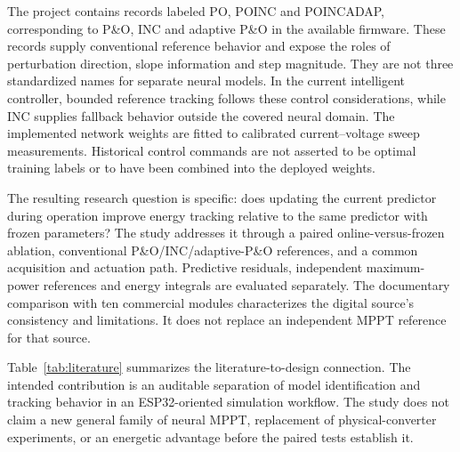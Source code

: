 The project contains records labeled PO, POINC and POINCADAP, corresponding to P\&O, INC and adaptive P\&O in the available firmware. These records supply conventional reference behavior and expose the roles of perturbation direction, slope information and step magnitude. They are not three standardized names for separate neural models. In the current intelligent controller, bounded reference tracking follows these control considerations, while INC supplies fallback behavior outside the covered neural domain. The implemented network weights are fitted to calibrated current--voltage sweep measurements. Historical control commands are not asserted to be optimal training labels or to have been combined into the deployed weights.

The resulting research question is specific: does updating the current predictor during operation improve energy tracking relative to the same predictor with frozen parameters? The study addresses it through a paired online-versus-frozen ablation, conventional P\&O/INC/adaptive-P\&O references, and a common acquisition and actuation path. Predictive residuals, independent maximum-power references and energy integrals are evaluated separately. The documentary comparison with ten commercial modules characterizes the digital source's consistency and limitations. It does not replace an independent MPPT reference for that source.

Table~\ref{tab:literature} summarizes the literature-to-design connection. The intended contribution is an auditable separation of model identification and tracking behavior in an ESP32-oriented simulation workflow. The study does not claim a new general family of neural MPPT, replacement of physical-converter experiments, or an energetic advantage before the paired tests establish it.

